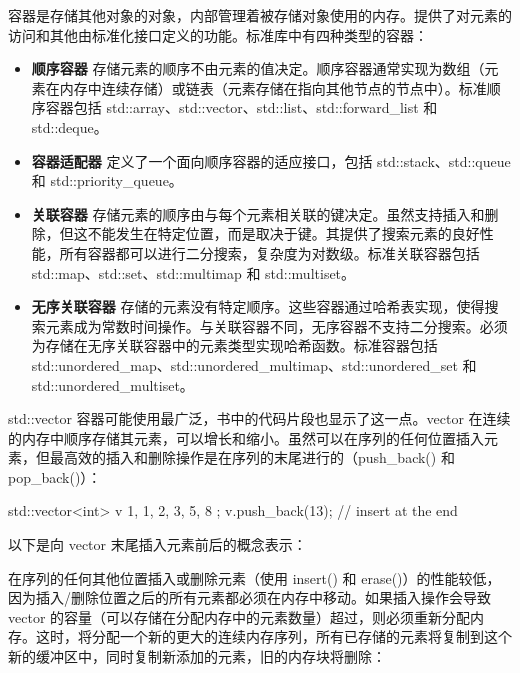 
容器是存储其他对象的对象，内部管理着被存储对象使用的内存。提供了对元素的访问和其他由标准化接口定义的功能。标准库中有四种类型的容器：

\begin{itemize}
\item
\textbf{顺序容器} 存储元素的顺序不由元素的值决定。顺序容器通常实现为数组（元素在内存中连续存储）或链表（元素存储在指向其他节点的节点中）。标准顺序容器包括 std::array、std::vector、std::list、std::forward\_list 和 std::deque。

\item
\textbf{容器适配器} 定义了一个面向顺序容器的适应接口，包括 std::stack、std::queue 和 std::priority\_queue。

\item
\textbf{关联容器} 存储元素的顺序由与每个元素相关联的键决定。虽然支持插入和删除，但这不能发生在特定位置，而是取决于键。其提供了搜索元素的良好性能，所有容器都可以进行二分搜索，复杂度为对数级。标准关联容器包括 std::map、std::set、std::multimap 和 std::multiset。

\item
\textbf{无序关联容器} 存储的元素没有特定顺序。这些容器通过哈希表实现，使得搜索元素成为常数时间操作。与关联容器不同，无序容器不支持二分搜索。必须为存储在无序关联容器中的元素类型实现哈希函数。标准容器包括 std::unordered\_map、std::unordered\_multimap、std::unordered\_set 和 std::unordered\_multiset。
\end{itemize}

std::vector 容器可能使用最广泛，书中的代码片段也显示了这一点。vector 在连续的内存中顺序存储其元素，可以增长和缩小。虽然可以在序列的任何位置插入元素，但最高效的插入和删除操作是在序列的末尾进行的（push\_back() 和 pop\_back()）：

\begin{cpp}
std::vector<int> v{ 1, 1, 2, 3, 5, 8 };
v.push_back(13); // insert at the end
\end{cpp}

以下是向 vector 末尾插入元素前后的概念表示：


在序列的任何其他位置插入或删除元素（使用 insert() 和 erase()）的性能较低，因为插入/删除位置之后的所有元素都必须在内存中移动。如果插入操作会导致 vector 的容量（可以存储在分配内存中的元素数量）超过，则必须重新分配内存。这时，将分配一个新的更大的连续内存序列，所有已存储的元素将复制到这个新的缓冲区中，同时复制新添加的元素，旧的内存块将删除：

